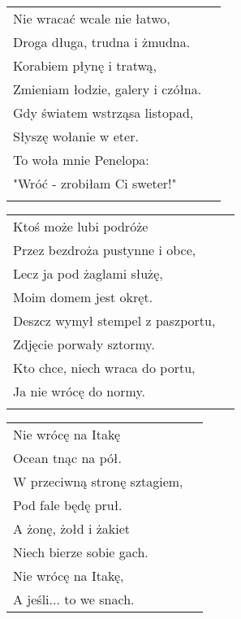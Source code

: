 \documentclass[a5paper]{article}
\begin{document}
\noindent
\begin{tabular}{@{}p{7.50cm}p{3cm}@{}}
Nie wracać wcale nie łatwo,  \\
Droga długa, trudna i żmudna. \\
Korabiem płynę i tratwą, \\
Zmieniam łodzie, galery i czółna. \\
Gdy światem wstrząsa listopad, \\
Słyszę wołanie w eter. \\
To woła mnie Penelopa: \\
"Wróć - zrobiłam Ci sweter!" \\ \\
\end{tabular}

\noindent
\begin{tabular}{@{}p{7.50cm}p{3cm}@{}}
Ktoś może lubi podróże \\
Przez bezdroża pustynne i obce, \\
Lecz ja pod żaglami służę, \\
Moim domem jest okręt. \\
Deszcz wymył stempel z paszportu, \\
Zdjęcie porwały sztormy. \\
Kto chce, niech wraca do portu, \\
Ja nie wrócę do normy. \\ \\
\end{tabular}

\noindent
\begin{tabular}{@{}p{7.50cm}p{3cm}@{}}
Nie wrócę na Itakę \\
Ocean tnąc na pół. \\
W przeciwną stronę sztagiem, \\
Pod fale będę pruł. \\
A żonę, żołd i żakiet \\
Niech bierze sobie gach. \\
Nie wrócę na Itakę, \\
A jeśli... to we snach.
\end{tabular}
\end{document}
